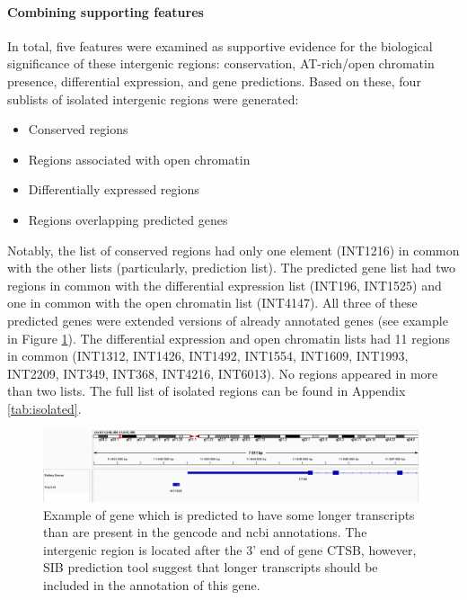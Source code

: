 \paragraph{Combining supporting features}

In total, five features were examined as supportive evidence for the biological significance of these intergenic regions:
conservation, AT-rich/open chromatin presence, differential expression, and gene predictions.
Based on these, four sublists of isolated intergenic regions were generated:

\begin{itemize}
  \item Conserved regions
  \item Regions associated with open chromatin
  \item Differentially expressed regions
  \item Regions overlapping predicted genes
\end{itemize}

Notably, the list of conserved regions had only one element (INT1216) in common with the other lists (particularly, prediction list).
The predicted gene list had two regions in common with the differential expression list (INT196, INT1525)
and one in common with the open chromatin list (INT4147).
All three of these predicted genes were extended versions of already annotated genes (see example in Figure \ref{fig:predictedExtension}).
The differential expression and open chromatin lists had 11 regions in common
(INT1312, INT1426, INT1492, INT1554, INT1609, INT1993, INT2209, INT349, INT368, INT4216, INT6013).
No regions appeared in more than two lists.
The full list of isolated regions can be found in Appendix \ref{tab:isolated}.

\begin{figure}
  \centering
  \includegraphics[width=\linewidth]{images/igv/INT1525.png}
  \caption{Example of gene which is predicted to have some longer transcripts than are present in the gencode and ncbi annotations.
  The intergenic region is located after the 3' end of gene CTSB, however,
  SIB prediction tool suggest that longer transcripts should be included in the annotation of this gene.}
  \label{fig:predictedExtension}
\end{figure}

